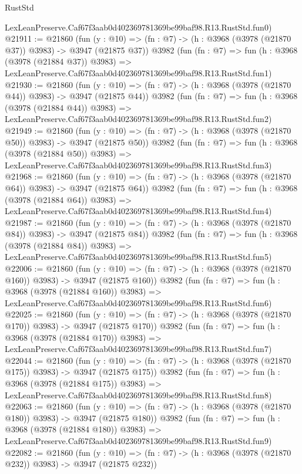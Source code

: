 \begin{lexlean}{RustStd}
\begin{coremodule}
    LexLeanPreserve.Caf67f3aab0d402369781369be99baf98.R13.RustStd.fun0)
@21911 := @21860
    (fun (y : @10) => (fn : @7) -> (h : @3968 (@3978 (@21870 @37)) @3983) -> @3947 (@21875 @37))
    @3982
    (fun (fn : @7) =>
    fun (h : @3968 (@3978 (@21884 @37)) @3983) =>
    LexLeanPreserve.Caf67f3aab0d402369781369be99baf98.R13.RustStd.fun1)
@21930 := @21860
    (fun (y : @10) => (fn : @7) -> (h : @3968 (@3978 (@21870 @44)) @3983) -> @3947 (@21875 @44))
    @3982
    (fun (fn : @7) =>
    fun (h : @3968 (@3978 (@21884 @44)) @3983) =>
    LexLeanPreserve.Caf67f3aab0d402369781369be99baf98.R13.RustStd.fun2)
@21949 := @21860
    (fun (y : @10) => (fn : @7) -> (h : @3968 (@3978 (@21870 @50)) @3983) -> @3947 (@21875 @50))
    @3982
    (fun (fn : @7) =>
    fun (h : @3968 (@3978 (@21884 @50)) @3983) =>
    LexLeanPreserve.Caf67f3aab0d402369781369be99baf98.R13.RustStd.fun3)
@21968 := @21860
    (fun (y : @10) => (fn : @7) -> (h : @3968 (@3978 (@21870 @64)) @3983) -> @3947 (@21875 @64))
    @3982
    (fun (fn : @7) =>
    fun (h : @3968 (@3978 (@21884 @64)) @3983) =>
    LexLeanPreserve.Caf67f3aab0d402369781369be99baf98.R13.RustStd.fun4)
@21987 := @21860
    (fun (y : @10) => (fn : @7) -> (h : @3968 (@3978 (@21870 @84)) @3983) -> @3947 (@21875 @84))
    @3982
    (fun (fn : @7) =>
    fun (h : @3968 (@3978 (@21884 @84)) @3983) =>
    LexLeanPreserve.Caf67f3aab0d402369781369be99baf98.R13.RustStd.fun5)
@22006 := @21860
    (fun (y : @10) => (fn : @7) -> (h : @3968 (@3978 (@21870 @160)) @3983) -> @3947 (@21875 @160))
    @3982
    (fun (fn : @7) =>
    fun (h : @3968 (@3978 (@21884 @160)) @3983) =>
    LexLeanPreserve.Caf67f3aab0d402369781369be99baf98.R13.RustStd.fun6)
@22025 := @21860
    (fun (y : @10) => (fn : @7) -> (h : @3968 (@3978 (@21870 @170)) @3983) -> @3947 (@21875 @170))
    @3982
    (fun (fn : @7) =>
    fun (h : @3968 (@3978 (@21884 @170)) @3983) =>
    LexLeanPreserve.Caf67f3aab0d402369781369be99baf98.R13.RustStd.fun7)
@22044 := @21860
    (fun (y : @10) => (fn : @7) -> (h : @3968 (@3978 (@21870 @175)) @3983) -> @3947 (@21875 @175))
    @3982
    (fun (fn : @7) =>
    fun (h : @3968 (@3978 (@21884 @175)) @3983) =>
    LexLeanPreserve.Caf67f3aab0d402369781369be99baf98.R13.RustStd.fun8)
@22063 := @21860
    (fun (y : @10) => (fn : @7) -> (h : @3968 (@3978 (@21870 @180)) @3983) -> @3947 (@21875 @180))
    @3982
    (fun (fn : @7) =>
    fun (h : @3968 (@3978 (@21884 @180)) @3983) =>
    LexLeanPreserve.Caf67f3aab0d402369781369be99baf98.R13.RustStd.fun9)
@22082 := @21860
    (fun (y : @10) => (fn : @7) -> (h : @3968 (@3978 (@21870 @232)) @3983) -> @3947 (@21875 @232))

\end{coremodule}
\end{lexlean}
